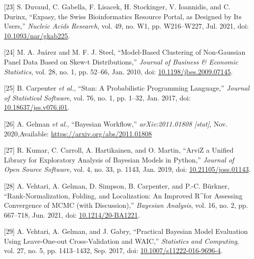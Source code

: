 \documentclass[11pt]{article}
\begin{document}
\hypertarget{citeproc_bib_item_23}{[23] S. Duvaud, C. Gabella, F. Lisacek, H. Stockinger, V. Ioannidis, and C. Durinx, “Expasy, the Swiss Bioinformatics Resource Portal, as Designed by Its Users,” \textit{Nucleic Acids Research}, vol. 49, no. W1, pp. W216–W227, Jul. 2021, doi: \href{https://doi.org/10.1093/nar/gkab225}{10.1093/nar/gkab225}.}

\hypertarget{citeproc_bib_item_24}{[24] M. A. Juárez and M. F. J. Steel, “Model-Based Clustering of Non-Gaussian Panel Data Based on Skew-t Distributions,” \textit{Journal of Business \& Economic Statistics}, vol. 28, no. 1, pp. 52–66, Jan. 2010, doi: \href{https://doi.org/10.1198/jbes.2009.07145}{10.1198/jbes.2009.07145}.}

\hypertarget{citeproc_bib_item_25}{[25] B. Carpenter \textit{et al.}, “Stan: A Probabilistic Programming Language,” \textit{Journal of Statistical Software}, vol. 76, no. 1, pp. 1–32, Jan. 2017, doi: \href{https://doi.org/10.18637/jss.v076.i01}{10.18637/jss.v076.i01}.}

\hypertarget{citeproc_bib_item_26}{[26] A. Gelman \textit{et al.}, “Bayesian Workflow,” \textit{arXiv:2011.01808 [stat]}, Nov. 2020,Available: \href{https://arxiv.org/abs/2011.01808}{https://arxiv.org/abs/2011.01808}}

\hypertarget{citeproc_bib_item_27}{[27] R. Kumar, C. Carroll, A. Hartikainen, and O. Martin, “ArviZ a Unified Library for Exploratory Analysis of Bayesian Models in Python,” \textit{Journal of Open Source Software}, vol. 4, no. 33, p. 1143, Jan. 2019, doi: \href{https://doi.org/10.21105/joss.01143}{10.21105/joss.01143}.}

\hypertarget{citeproc_bib_item_28}{[28] A. Vehtari, A. Gelman, D. Simpson, B. Carpenter, and P.-C. Bürkner, “Rank-Normalization, Folding, and Localization: An Improved R\textasciicircum for Assessing Convergence of MCMC (with Discussion),” \textit{Bayesian Analysis}, vol. 16, no. 2, pp. 667–718, Jun. 2021, doi: \href{https://doi.org/10.1214/20-BA1221}{10.1214/20-BA1221}.}

\hypertarget{citeproc_bib_item_29}{[29] A. Vehtari, A. Gelman, and J. Gabry, “Practical Bayesian Model Evaluation Using Leave-One-out Cross-Validation and WAIC,” \textit{Statistics and Computing}, vol. 27, no. 5, pp. 1413–1432, Sep. 2017, doi: \href{https://doi.org/10.1007/s11222-016-9696-4}{10.1007/s11222-016-9696-4}.}
\end{document}
